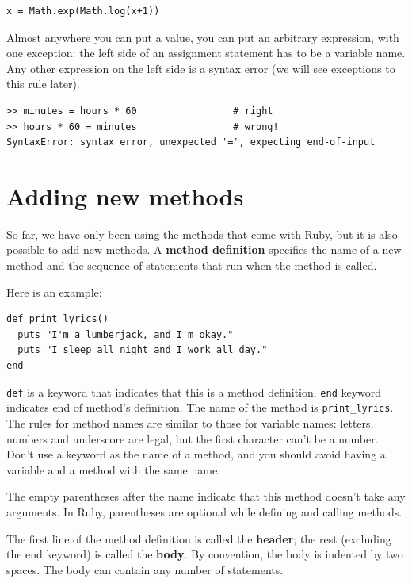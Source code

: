 \documentclass[10pt]{book}
\begin{document}
\begin{verbatim}
x = Math.exp(Math.log(x+1))
\end{verbatim}
%
Almost anywhere you can put a value, you can put an arbitrary
expression, with one exception: the left side of an assignment
statement has to be a variable name.  Any other expression on the left
side is a syntax error (we will see exceptions to this rule
later).

\begin{verbatim}
>> minutes = hours * 60                 # right
>> hours * 60 = minutes                 # wrong!
SyntaxError: syntax error, unexpected '=', expecting end-of-input
\end{verbatim}
%


\section{Adding new methods}

So far, we have only been using the methods that come with Ruby,
but it is also possible to add new methods.
A {\bf method definition} specifies the name of a new method and
the sequence of statements that run when the method is called.

Here is an example:

\begin{verbatim}
def print_lyrics()
  puts "I'm a lumberjack, and I'm okay."
  puts "I sleep all night and I work all day."
end
\end{verbatim}
%
{\tt def} is a keyword that indicates that this is a method
definition.  {\tt end} keyword indicates end of method's definition.
The name of the method is \verb"print_lyrics".  The
rules for method names are similar to those for variable names: letters,
numbers and underscore are legal, but the first character
can't be a number.  Don't use a keyword as the name of a method,
and you should avoid having a variable and a method with the same
name.

The empty parentheses after the name indicate that this method
doesn't take any arguments.  In Ruby, parentheses are optional
while defining and calling methods.

The first line of the method definition is called the {\bf header};
the rest (excluding the end keyword) is called the {\bf body}.
By convention, the body is indented by
two spaces.  The body can contain any number of statements.
\end{document}
